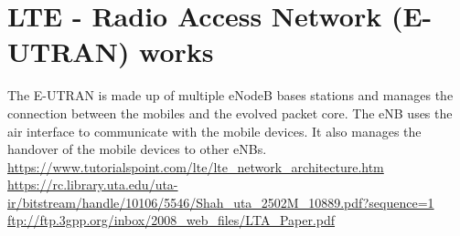 \section{LTE - Radio Access Network (E-UTRAN) works}
{
    The E-UTRAN is made up of multiple eNodeB bases stations and manages the connection between the mobiles and the evolved packet core. The eNB uses the air interface to communicate with the mobile devices. It also manages the handover of the mobile devices to other eNBs.
    \url{https://www.tutorialspoint.com/lte/lte_network_architecture.htm}
    \url{https://rc.library.uta.edu/uta-ir/bitstream/handle/10106/5546/Shah_uta_2502M_10889.pdf?sequence=1}
    \url{ftp://ftp.3gpp.org/inbox/2008_web_files/LTA_Paper.pdf}
}